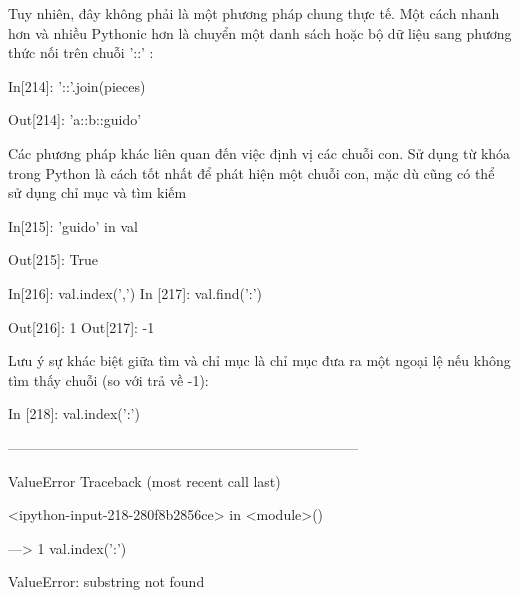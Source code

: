Tuy nhiên, đây không phải là một phương pháp chung thực tế. Một cách nhanh hơn và nhiều Pythonic hơn là chuyển một danh sách hoặc bộ dữ liệu sang phương thức nối trên chuỗi '::' : \par
\hspace{1cm}In\hspace{3mm}[214]:\hspace{3mm} '::'.join(pieces)\par
\hspace{1cm}Out[214]:\hspace{3mm} 'a::b::guido'\par
Các phương pháp khác liên quan đến việc định vị các chuỗi con. Sử dụng từ khóa trong Python là cách tốt nhất để phát hiện một chuỗi con, mặc dù cũng có thể sử dụng chỉ mục và tìm kiếm \par
\hspace{1cm}In\hspace{3mm}[215]:\hspace{3mm} 'guido' in val\par
\hspace{1cm}Out[215]:\hspace{3mm} True\par
\hspace{1cm}In\hspace{3mm}[216]:\hspace{3mm} val.index(',') In [217]: val.find(':')\par
\hspace{1cm}Out[216]:\hspace{3mm} 1 Out[217]: -1 \par
Lưu ý sự khác biệt giữa tìm và chỉ mục là chỉ mục đưa ra một ngoại lệ nếu không tìm thấy chuỗi (so với trả về -1):\par
\hspace{1cm}In [218]:\hspace{3mm} val.index(':')\par
\hspace{1cm}---------------------------------------------------------------------------\par
\hspace{1cm}ValueError Traceback (most recent call last)\par
\hspace{1cm}<ipython-input-218-280f8b2856ce> in <module>() \par
\hspace{1cm}---> 1 val.index(':')\par
\hspace{1cm}ValueError:\hspace{3mm} substring not found \par
